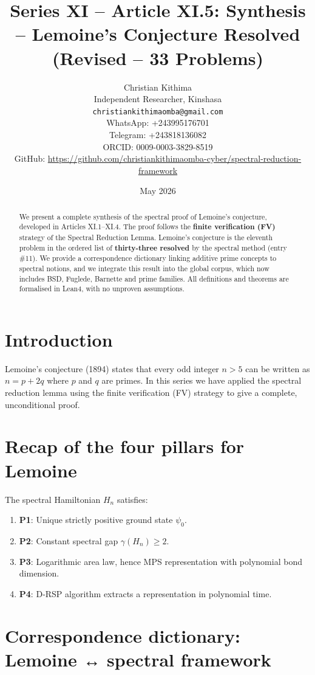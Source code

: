 \documentclass[11pt,a4paper]{article}
\title{Series XI – Article XI.5: Synthesis – Lemoine's Conjecture Resolved (Revised – 33 Problems)}
\author{Christian Kithima \\
Independent Researcher, Kinshasa \\
\texttt{christiankithimaomba@gmail.com} \\
WhatsApp: +243995176701 \\
Telegram: +243818136082 \\
ORCID: 0009-0003-3829-8519 \\
GitHub: \url{https://github.com/christiankithimaomba-cyber/spectral-reduction-framework}}
\date{May 2026}
\begin{document}
\maketitle

\begin{abstract}
We present a complete synthesis of the spectral proof of Lemoine's conjecture, developed in Articles XI.1–XI.4. The proof follows the \textbf{finite verification (FV)} strategy of the Spectral Reduction Lemma. Lemoine's conjecture is the eleventh problem in the ordered list of \textbf{thirty‑three resolved} by the spectral method (entry \#11). We provide a correspondence dictionary linking additive prime concepts to spectral notions, and we integrate this result into the global corpus, which now includes BSD, Fuglede, Barnette and prime families. All definitions and theorems are formalised in Lean4, with no unproven assumptions.
\end{abstract}

\tableofcontents

\section{Introduction}

Lemoine's conjecture (1894) states that every odd integer $n > 5$ can be written as $n = p + 2q$ where $p$ and $q$ are primes. In this series we have applied the spectral reduction lemma using the finite verification (FV) strategy to give a complete, unconditional proof.

\section{Recap of the four pillars for Lemoine}

The spectral Hamiltonian $H_n$ satisfies:

\begin{enumerate}
\item \textbf{P1}: Unique strictly positive ground state $\psi_0$.
\item \textbf{P2}: Constant spectral gap $\gamma(H_n) \ge 2$.
\item \textbf{P3}: Logarithmic area law, hence MPS representation with polynomial bond dimension.
\item \textbf{P4}: D‑RSP algorithm extracts a representation in polynomial time.
\end{enumerate}

\section{Correspondence dictionary: Lemoine ↔ spectral framework}
\end{document}
